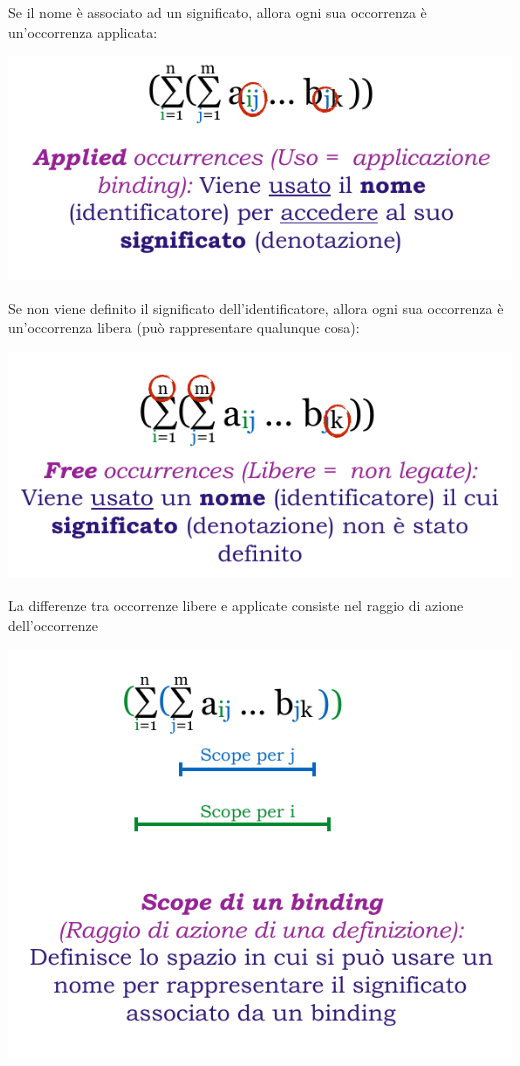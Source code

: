 \documentclass[a4paper, 10pt]{report}
\begin{document}
\noindent Se il nome è associato ad un significato, allora ogni sua occorrenza è un'occorrenza applicata:
\begin{center}
\includegraphics[scale=0.7]{2.pdf}

\end{center}

\noindent Se non viene definito il significato dell'identificatore, allora ogni sua occorrenza è un'occorrenza libera (può rappresentare qualunque cosa):
\begin{center}
\includegraphics[scale=0.7]{3.pdf}

\end{center}

\noindent La differenze tra occorrenze libere e applicate consiste nel raggio di azione dell'occorrenze 
\begin{center}
\includegraphics[scale=0.7]{4.pdf}

\end{center}
\end{document}
